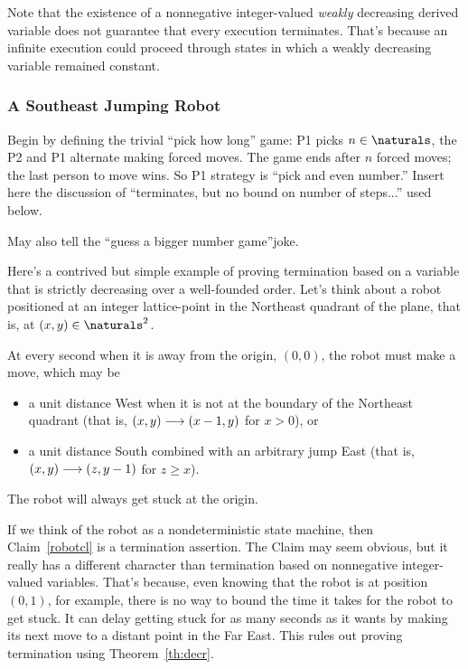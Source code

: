 \begin{editingnotes}
Note that the existence of a nonnegative integer-valued \emph{weakly}
decreasing derived variable does not guarantee that every execution
terminates.  That's because an infinite execution could proceed through
states in which a weakly decreasing variable remained constant.

\subsubsection{A Southeast Jumping Robot}

\begin{staffnotes}Begin by defining the trivial ``pick how long'' game: P1 picks $n
\in \naturals$, the P2 and P1 alternate making forced moves.  The game
ends after $n$ forced moves; the last person to move wins.  So P1 strategy
is ``pick and even number.''  Insert here the discussion of ``terminates,
but no bound on number of steps...'' used below.

May also tell the ``guess a bigger number game''joke.
\end{staffnotes}

Here's a contrived but simple example of proving termination based on a
variable that is strictly decreasing over a well-founded order.  Let's
think about a robot positioned at an integer lattice-point in the
Northeast quadrant of the plane, that is, at $(x,y) \in \naturals^2$.

At every second when it is away from the origin, $(0,0)$, the robot must
make a move, which may be
\begin{itemize}

\item a unit distance West when it is not at the boundary of the Northeast
  quadrant (that is, $(x,y) \mathrel{\longrightarrow} (x-1,y)$ for $x>0$), or

\item a unit distance South combined with an arbitrary jump East (that is,
     $(x,y) \mathrel{\longrightarrow} (z,y-1)$ for $z\geq x$).

\end{itemize}
\begin{claim}\label{robotcl}
The robot will always get stuck at the origin.
\end{claim}

If we think of the robot as a nondeterministic state machine, then
Claim~\ref{robotcl} is a termination assertion.  The Claim may seem
obvious, but it really has a different character than termination based on
nonnegative integer-valued variables.  That's because, even knowing that
the robot is at position $(0,1)$, for example, there is no way to bound
the time it takes for the robot to get stuck.  It can delay getting stuck
for as many seconds as it wants by making its next move to a distant point
in the Far East.  This rules out proving termination using
Theorem~\ref{th:decr}.


\end{editingnotes}
